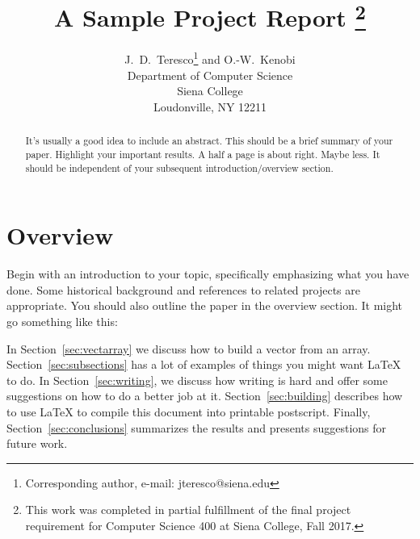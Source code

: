 \documentclass[12pt]{article}
\newcommand{\doublespace}{
  \protect\renewcommand\baselinestretch{1.5}
  \protect\normalsize
}
\begin{document}
\date{}

\title{A Sample Project Report
\footnote{This work was completed in partial fulfillment of the final
project requirement for Computer Science 400 at Siena College, Fall 2017.}}

\author{J.~D.~Teresco\footnote{Corresponding author, e-mail:
jteresco@siena.edu} and O.-W.~Kenobi\\
Department of Computer Science\\
Siena College\\
Loudonville, NY  12211
}

\maketitle
\thispagestyle{empty}

\begin{abstract}
It's usually a good idea to include an abstract.  This should be a
brief summary of your paper.  Highlight your important results.  A
half a page is about right.  Maybe less.  It should be independent of
your subsequent introduction/overview section.
\end{abstract}

\doublespace

\section{Overview}
\label{sec:overview}

Begin with an introduction to your topic, specifically emphasizing
what you have done.  Some historical background and references to
related projects are appropriate.  You should also outline the paper
in the overview section.  It might go something like this:

In Section~\ref{sec:vectarray} we discuss how to build a vector from
an array.  Section~\ref{sec:subsections} has a lot of examples of
things you might want \LaTeX~\cite{lamport86} to do.  In
Section~\ref{sec:writing}, we discuss how writing is hard and offer
some suggestions on how to do a better job at it.
Section~\ref{sec:building} describes how to use \LaTeX{} to compile
this document into printable postscript.  Finally,
Section~\ref{sec:conclusions} summarizes the results and presents
suggestions for future work.
\end{document}
